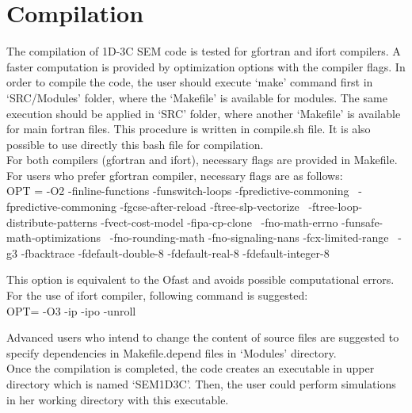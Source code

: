 \chapter{Compilation}

The compilation of 1D-3C SEM code is tested for gfortran and ifort compilers. A faster computation is provided by optimization options with the compiler flags. In order to compile the code, the user should execute ‘make’ command first  in ‘SRC/Modules’ folder, where the ‘Makefile’ is available for modules. The same execution should be applied in ‘SRC’ folder, where another ‘Makefile’ is available for main fortran files. This procedure is written in compile.sh file. It is also possible to use directly this bash file for compilation.  \\

For both compilers (gfortran and ifort), necessary flags are provided in Makefile.  For users who prefer gfortran compiler, necessary flags are as follows:\\

OPT  = -O2 -finline-functions -funswitch-loops -fpredictive-commoning \
                  -fpredictive-commoning  -fgcse-after-reload -ftree-slp-vectorize  \
                  -ftree-loop-distribute-patterns -fvect-cost-model -fipa-cp-clone  \
                  -fno-math-errno -funsafe-math-optimizations  \
                  -fno-rounding-math -fno-signaling-nans -fcx-limited-range  \
                  -g3 -fbacktrace  -fdefault-double-8 -fdefault-real-8 -fdefault-integer-8

This option is equivalent to the Ofast and avoids possible computational errors. For the use of ifort compiler, following command is suggested:\\

OPT= -O3 -ip -ipo -unroll

Advanced users who intend to change the content of source files are suggested to specify dependencies in Makefile.depend files in ‘Modules’ directory.\\

Once the compilation is completed, the code creates an executable in upper directory which is named ‘SEM1D3C’. Then, the user could perform simulations in her working directory with this executable.\\
